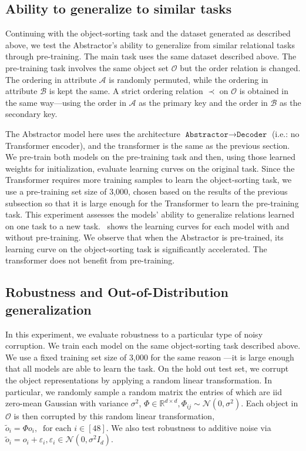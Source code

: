 \subsection{Ability to generalize to similar tasks}

Continuing with the object-sorting task and the dataset generated as described above, we test the Abstractor's ability to generalize from similar relational tasks through pre-training. The main task uses the same dataset described above. The pre-training task involves the same object set $\mathcal{O}$ but the order relation is changed. The ordering in attribute $\mathcal{A}$ is randomly permuted, while the ordering in attribute $\mathcal{B}$ is kept the same. A strict ordering relation $\prec$ on $\mathcal{O}$ is obtained in the same way---using the order in $\mathcal{A}$ as the primary key and the order in $\mathcal{B}$ as the secondary key.

The Abstractor model here uses the architecture $\texttt{Abstractor} \to \texttt{Decoder}$ (i.e.: no Transformer
encoder), and the transformer is the same as the previous section. We pre-train both models on the pre-training task
and then, using those learned weights for initialization, evaluate learning curves on the original task. Since the
Transformer requires more training samples to learn the object-sorting task, we use a pre-training set size of 3,000, chosen based on the results of the previous subsection so that it is large enough for the Transformer to learn the pre-training task. This experiment assesses the models' ability to generalize relations learned on one task to a new task.~ shows the learning curves for each model with and without pre-training. We observe that when the Abstractor is pre-trained, its learning curve on the object-sorting task is significantly accelerated. The transformer does not benefit from pre-training.

\subsection{Robustness and Out-of-Distribution generalization}
In this experiment, we evaluate robustness to a particular type of noisy corruption. We train each model on the same
object-sorting task described above. We use a fixed training set size of 3,000 for the same reason
---it is large enough that all models are able to learn the task. On the hold out test set, we corrupt the object
representations by applying a random linear transformation. In particular, we randomly sample a random matrix the
entries of which are iid zero-mean Gaussian with variance $\sigma^2$, $\Phi \in \mathbb{R}^{d \times d}, \Phi_{ij} \sim \mathcal{N}(0, \sigma^2)$. Each object in $\mathcal{O}$ is then corrupted by this random linear transformation,
$\tilde{o}_i = \Phi o_i, \ \text{ for each } i \in [48]$. We also test robustness to additive noise via $\tilde{o}_i = o_i + \varepsilon_i, \varepsilon_i \in \mathcal{N}(0, \sigma^2 I_d)$.

